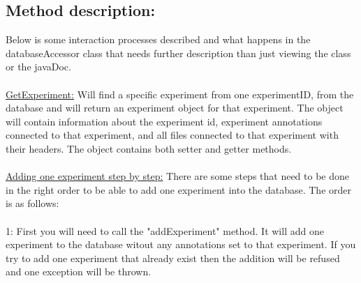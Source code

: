 \subsection{Method description:}
Below is some interaction processes described and what happens in the databaseAccessor class that needs further description than just viewing the class or the javaDoc.\\
\\
\underline{GetExperiment:} Will find a specific experiment from one experimentID, from the database and will return an experiment object for that experiment. The object will contain information about the experiment id, experiment annotations connected to that experiment, and all files connected to that experiment with their headers. The object contains both setter and getter methods. \\
\\
\underline{Adding one experiment step by step:}
There are some steps that need to be done in the right order to be able to add one experiment into the database. The order is as follows:\\
\\
1: First you will need to call the "addExperiment" method. It will add one experiment to the database witout any annotations set to that experiment. If you try to add one experiment that already exist then the addition will be refused and one exception will be thrown.

